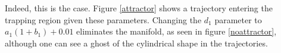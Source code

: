 \documentclass[%
        final,
        notitlepage,
        narroweqnarray,
        inline,
        ]{ieee}
\begin{document}
Indeed, this is the case. Figure \ref{attractor} shows a trajectory entering the trapping region given these parameters. Changing the $d_1$ parameter to $a_1 ( 1 + b_1) + 0.01$ eliminates the manifold, as seen in figure \ref{noattractor}, although one can see a ghost of the cylindrical shape in the trajectories.


%



\nocite{*}
\end{document}
